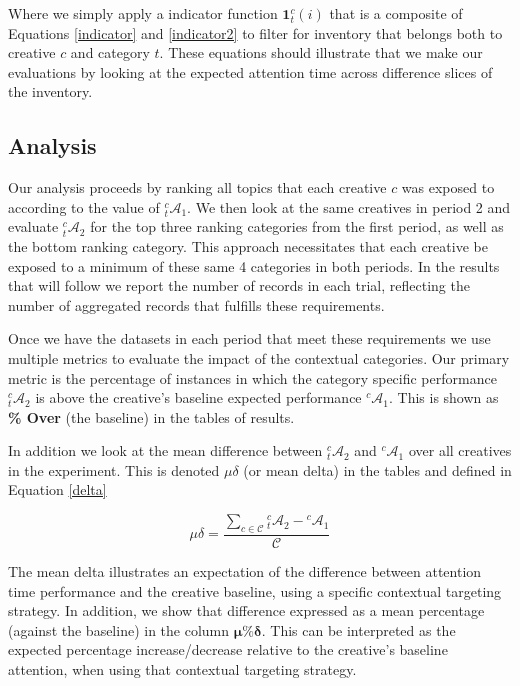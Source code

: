 \documentclass[sigconf]{acmart}
\begin{document}
Where we simply apply a indicator function $\mathbf{1}^c_t(i)$ that is a composite
of Equations \ref{indicator} and \ref{indicator2} to filter for inventory that
belongs both to creative $c$ and category $t$. These equations should illustrate that we
make our evaluations by looking at the expected attention time across difference slices
of the inventory.

\subsection{Analysis}

Our analysis proceeds by ranking all topics that each creative $c$ was exposed
to according to the value of ${}^c_t\mathcal{A}_1$.
We then look at the same creatives in period 2 and
evaluate ${}^c_t\mathcal{A}_2$ for the top three ranking categories from the first period,
as well as the bottom ranking category.
This approach necessitates that each creative be exposed to a minimum
of these same 4 categories in both periods.
In the results that will follow we report the number
of records in each trial, reflecting the number of aggregated records
that fulfills these requirements.

Once we have the datasets in each period that meet these requirements we use multiple metrics
to evaluate the impact of the contextual categories. Our primary metric is the percentage
of instances in which the category specific performance ${}^c_t\mathcal{A}_2$ is above the
creative's baseline expected performance ${}^c\mathcal{A}_1$.
This is shown as \textbf{\% Over} (the baseline) in the tables of results.

In addition we look at the mean difference between ${}^c_t\mathcal{A}_2$ and ${}^c\mathcal{A}_1$
over all creatives in the experiment. This is denoted \boldmath$\mu\delta$ (or mean delta) in
the tables and defined in Equation \ref{delta}

\begin{equation}
\label{delta}
\mu\delta = \frac{ \sum_{c \in \mathcal{C}} {}^c_t\mathcal{A}_2 - {}^c\mathcal{A}_1 }{ \mathcal{C} }
\end{equation}

The mean delta illustrates an expectation of the difference between attention time performance
and the creative baseline, using a specific contextual targeting strategy. In addition, we show
that difference expressed as a mean percentage (against the baseline) in the column
$\mathbf{\mu\%\delta}$. This can be interpreted as the expected percentage increase/decrease
relative to the creative's baseline attention, when using that contextual targeting strategy.
\end{document}
